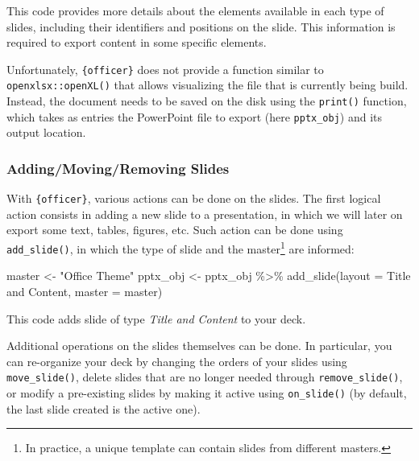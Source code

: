 \documentclass[
]{krantz}
\makeatletter
\newenvironment{Shaded}{\begin{snugshade}}{\end{snugshade}}
\newcommand{\AttributeTok}[1]{\textcolor[rgb]{0.61,0.61,0.61}{#1}}
\newcommand{\FunctionTok}[1]{\textcolor[rgb]{0,0,0}{#1}}
\newcommand{\NormalTok}[1]{#1}
\newcommand{\OtherTok}[1]{\textcolor[rgb]{0.37,0.37,0.37}{#1}}
\newcommand{\SpecialCharTok}[1]{\textcolor[rgb]{0,0,0}{#1}}
\newcommand{\StringTok}[1]{\textcolor[rgb]{0.5,0.5,0.5}{#1}}
\renewenvironment{quote}{\begin{VF}}{\end{VF}}
\newenvironment{kframe}{%
\medskip{}
\setlength{\fboxsep}{.8em}
 \def\at@end@of@kframe{}%
 \ifinner\ifhmode%
  \def\at@end@of@kframe{\end{minipage}}%
  \begin{minipage}{\columnwidth}%
 \fi\fi%
 \def\FrameCommand##1{\hskip\@totalleftmargin \hskip-\fboxsep
 \colorbox{shadecolor}{##1}\hskip-\fboxsep
     \hskip-\linewidth \hskip-\@totalleftmargin \hskip\columnwidth}%
 \MakeFramed {\advance\hsize-\width
   \@totalleftmargin\z@ \linewidth\hsize
   \@setminipage}}%
 {\par\unskip\endMakeFramed%
 \at@end@of@kframe}
\renewenvironment{Shaded}{\begin{kframe}}{\end{kframe}}
\makeatother
\begin{document}
This code provides more details about the elements available in each type of slides, including their identifiers and positions on the slide. This information is required to export content in some specific elements.

\begin{quote}
Unfortunately, \texttt{\{officer\}} does not provide a function similar to \texttt{openxlsx::openXL()} that allows visualizing the file that is currently being build. Instead, the document needs to be saved on the disk using the \texttt{print()} function, which takes as entries the PowerPoint file to export (here \texttt{pptx\_obj}) and its output location.
\end{quote}

\hypertarget{addingmovingremoving-slides}{%
\subsubsection{Adding/Moving/Removing Slides}\label{addingmovingremoving-slides}}

With \texttt{\{officer\}}, various actions can be done on the slides. The first logical action consists in adding a new slide to a presentation, in which we will later on export some text, tables, figures, etc. Such action can be done using \texttt{add\_slide()}, in which the type of slide and the master\footnote{In practice, a unique template can contain slides from different masters.} are informed:

\begin{Shaded}
\begin{Highlighting}[]
\NormalTok{master }\OtherTok{\textless{}{-}} \StringTok{"Office Theme"}
\NormalTok{pptx\_obj }\OtherTok{\textless{}{-}}\NormalTok{ pptx\_obj }\SpecialCharTok{\%\textgreater{}\%} 
  \FunctionTok{add\_slide}\NormalTok{(}\AttributeTok{layout =} \StringTok{\textquotesingle{}Title and Content\textquotesingle{}}\NormalTok{, }\AttributeTok{master =}\NormalTok{ master)}
\end{Highlighting}
\end{Shaded}

This code adds slide of type \emph{Title and Content} to your deck.

Additional operations on the slides themselves can be done. In particular, you can re-organize your deck by changing the orders of your slides using \texttt{move\_slide()}, delete slides that are no longer needed through \texttt{remove\_slide()}, or modify a pre-existing slides by making it active using \texttt{on\_slide()} (by default, the last slide created is the active one).
\end{document}
